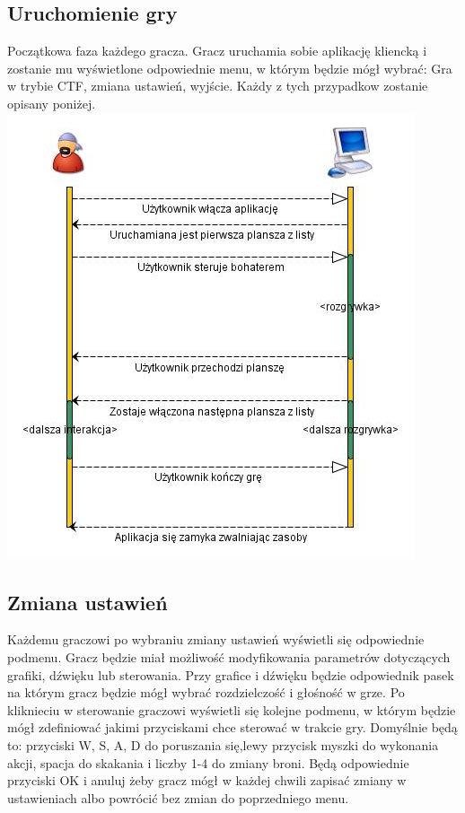 \documentclass[12pt,a4paper,twoside]{article}
\begin{document}
\subsection{Uruchomienie gry}
Początkowa faza każdego gracza. Gracz uruchamia sobie aplikację kliencką i zostanie mu wyświetlone odpowiednie menu, w którym będzie mógł wybrać: Gra w trybie CTF, zmiana ustawień, wyjście. Każdy z tych przypadkow zostanie opisany poniżej.
\\
\includegraphics{pics/WejscieDoGry.jpg}

\subsection{Zmiana ustawień}
Każdemu graczowi po wybraniu zmiany ustawień wyświetli się odpowiednie podmenu. Gracz będzie miał możliwość modyfikowania parametrów dotyczących grafiki, dźwięku lub sterowania. Przy grafice i dźwięku będzie odpowiednik pasek na którym gracz będzie mógł wybrać rozdzielczość i głośność w grze. Po kliknieciu w sterowanie graczowi wyświetli się kolejne podmenu, w którym będzie mógł zdefiniować jakimi przyciskami chce sterować w trakcie gry. Domyślnie będą to: przyciski W, S, A, D do poruszania się,lewy przycisk myszki do wykonania akcji, spacja do skakania i liczby 1-4 do zmiany broni. Będą odpowiednie przyciski OK i anuluj żeby gracz mógł w każdej chwili zapisać zmiany w ustawieniach albo powrócić bez zmian do poprzedniego menu.
\end{document}
